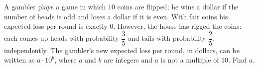 A gambler plays a game in which $10$ coins are flipped; he wins a dollar if the number of heads is odd and loses a dollar if it is even. With fair coins his expected loss per round is exactly $0$. However, the house has rigged the coins: each comes up heads with probability $\dfrac35$ and tails with probability $\dfrac25$, independently. The gambler's new expected loss per round, in dollars, can be written as $a\cdot10^b$, where $a$ and $b$ are integers and $a$ is not a multiple of $10$. Find $a$.
